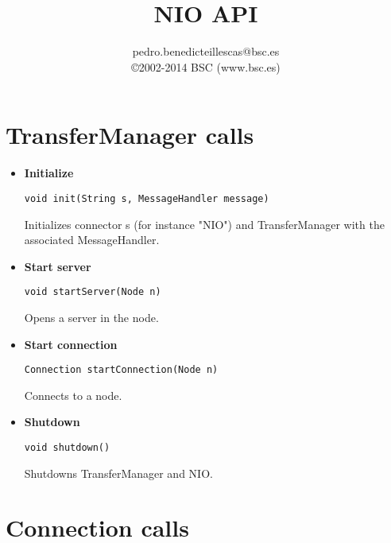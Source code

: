 \documentclass[10pt]{article}
\title{\textbf{NIO API}}
\author{pedro.benedicteillescas@bsc.es\\\copyright 2002-2014 BSC (www.bsc.es)}
\date{}
\begin{document}
\maketitle

\section{TransferManager calls}
\begin{itemize}

	\item \textbf{Initialize}
	\begin{lstlisting}
void init(String s, MessageHandler message)
	\end{lstlisting}
	Initializes connector s (for instance "NIO") and TransferManager with the associated MessageHandler.
	\item \textbf{Start server}
	\begin{lstlisting}
void startServer(Node n)
	\end{lstlisting}
	Opens a server in the node.
	\item \textbf{Start connection}
	\begin{lstlisting}
Connection startConnection(Node n)
	\end{lstlisting}
	Connects to a node.
	\item \textbf{Shutdown}
	\begin{lstlisting}
void shutdown()
	\end{lstlisting}
	Shutdowns TransferManager and NIO.
\end{itemize}

\section{Connection calls}
\end{document}
